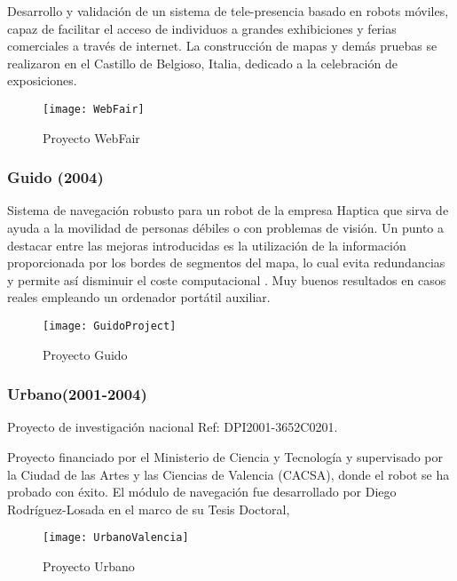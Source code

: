 Desarrollo y validación de un sistema de tele-presencia basado en robots móviles, capaz de facilitar el acceso de individuos a grandes exhibiciones y ferias comerciales a través de internet. La construcción de mapas y demás pruebas se realizaron en el Castillo de Belgioso, Italia, dedicado a la celebración de exposiciones.

\begin{figure}[h]
  \centering\texttt{[image: WebFair]}\\
  \caption{Proyecto WebFair}\label{fg:WebFair}
\end{figure}

\subsubsection{Guido (2004)}
Sistema de navegación robusto para un robot de la empresa Haptica que sirva de ayuda a la movilidad de personas débiles o con problemas de visión. Un punto a destacar entre las mejoras introducidas es la utilización de la información proporcionada por los bordes de segmentos del mapa, lo cual evita redundancias y permite así disminuir el coste computacional \cite{RodriguezLosada05}. Muy buenos resultados en casos reales empleando un ordenador portátil auxiliar.

\begin{figure}[h]
  \centering\texttt{[image: GuidoProject]}\\
  \caption{Proyecto Guido}\label{fg:guido}
\end{figure}

\subsubsection{Urbano(2001-2004)}\label{UrbanoProject}
Proyecto de investigación nacional Ref: DPI2001-3652C0201.

Proyecto financiado por el Ministerio de Ciencia y Tecnología y supervisado por la Ciudad de las Artes y las Ciencias de Valencia (CACSA), donde el robot se ha probado con éxito. El módulo de navegación fue desarrollado por Diego Rodríguez-Losada en el marco de su Tesis Doctoral,\cite{Rodriguez-Losada04}

\begin{figure}[h]
  \centering\texttt{[image: UrbanoValencia]}\\
  \caption{Proyecto Urbano}\label{fg:urbano}
\end{figure}

